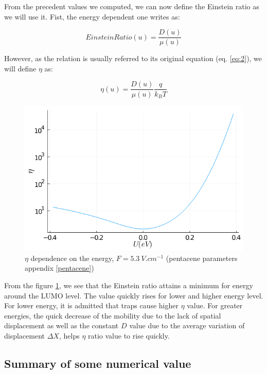From the precedent values we computed, we can now define the Einstein ratio as we will use it. Fist, the energy dependent one writes as:

\begin{equation}
    EinsteinRatio(u) = \frac{D(u)}{\mu(u)}
    \label{eq:3_13}
\end{equation}

However, as the relation is usually referred to its original equation (eq. \ref{eq:2}), we will define $\eta$ as:

\begin{equation}
    \eta(u) = \frac{D(u)}{\mu(u)} \frac{q}{k_BT}
    \label{eq:3_14}
\end{equation}

\begin{figure}[!h]
    \centering
    \includegraphics*[width=.5\paperwidth]{figures/3_elec/ein_u.png}
    \caption{$\eta$ dependence on the energy, $F = \SI{5.3}{V . cm^{-1}}$ (pentacene parameters appendix \ref{pentacene})\label{fig:3_12}}
\end{figure}


From the figure \ref{fig:3_12}, we see that the Einstein ratio attains a minimum for energy around the LUMO level. The value quickly rises for lower and higher energy level. For lower energy, it is admitted that traps cause higher $\eta$ value. For greater energies, the quick decrease of the mobility due to the lack of spatial displacement as well as the constant $D$ value due to the average variation of displacement $\Delta X$, helps $\eta$ ratio value to rise quickly.

\subsection{Summary of some numerical value}

